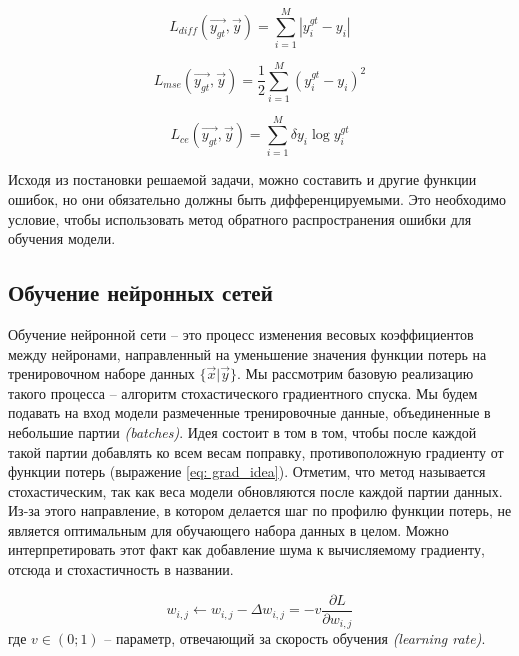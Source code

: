 \begin{equation}\label{eq:diff}
    L_{diff}(\vec{y_{gt}}, \vec{y}) = \sum_{i=1}^M | y^{gt}_{i} - y_{i} |
\end{equation}

\begin{equation}\label{eq: se}
    L_{mse}(\vec{y_{gt}}, \vec{y}) = \frac{1}{2} \sum_{i=1}^M (y^{gt}_{i} - y_{i})^2
\end{equation}

\begin{equation}\label{eq: cross_entropy}
    L_{ce}(\vec{y_{gt}}, \vec{y}) =  \sum_{i=1}^M \delta y_{i} \log{y^{gt}_{i}}
\end{equation}



\indent
\indent
Исходя из постановки решаемой задачи, можно составить и другие функции ошибок, но
они обязательно должны быть дифференцируемыми.
Это необходимо условие, чтобы использовать метод обратного распространения
ошибки для обучения модели.


\subsection{Обучение нейронных сетей}

\indent
\indent
Обучение нейронной сети -- это процесс изменения весовых
коэффициентов между нейронами, направленный на уменьшение
 значения функции потерь на тренировочном наборе данных $\{ \vec{x} | \vec{y} \}$. 
 Мы рассмотрим базовую реализацию такого процесса -- алгоритм 
 стохастического градиентного спуска. Мы будем подавать на вход модели
 размеченные тренировочные данные, объединенные в  небольшие партии 
 \textit{(batches)}. Идея состоит в том в том, чтобы после каждой такой партии
добавлять ко всем весам поправку, противоположную градиенту от функции потерь
(выражение \ref{eq: grad_idea}). 
Отметим, что метод называется стохастическим, так как веса 
модели обновляются после каждой партии данных. Из-за этого
направление, в котором делается шаг по профилю функции потерь,
не является оптимальным для обучающего набора данных в целом.
Можно интерпретировать этот факт как добавление шума
к вычисляемому градиенту, отсюда и стохастичность в названии.


\begin{equation}\label{eq: grad_idea}
    w_{i, j} \leftarrow w_{i, j} - \Delta w_{i,j} = - v \frac{\partial L}{\partial w_{i, j}}
\end{equation}
где $v \in (0; 1)$ -- параметр, отвечающий за скорость обучения \textit{(learning rate)}.

